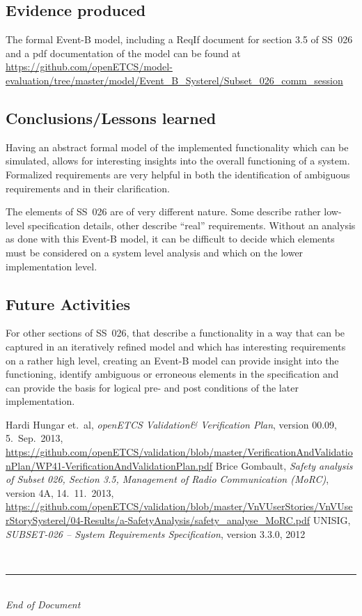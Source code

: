 \documentclass{article}
\newcommand{\nl}{\mbox{}\\}
\newcommand{\eod}{\nl\rule{.95\textwidth}{1pt}\nl\textit{End of Document}}
\begin{document}
\subsection{Evidence produced}
\label{sec:evidence-produced}

The formal Event-B model, including a ReqIf document for section 3.5 of SS~026
and a pdf documentation of the model can be found at
\url{https://github.com/openETCS/model-evaluation/tree/master/model/Event_B_Systerel/Subset_026_comm_session}

\subsection{Conclusions/Lessons learned}

Having an abstract formal model of the implemented functionality which can be
simulated, allows for interesting insights into the overall functioning of a
system. Formalized requirements are very helpful in both the identification of
ambiguous requirements and in their clarification.

The elements of SS~026 are of very different nature. Some describe rather
low-level specification details, other describe ``real'' requirements. Without
an analysis as done with this Event-B model, it can be difficult to decide which
elements must be considered on a system level analysis and which on the lower
implementation level.


\subsection{Future Activities}
\label{sec:future-activities}

For other sections of SS~026, that describe a functionality in a way that can be
captured in an iteratively refined model and which has interesting requirements
on a rather high level, creating an Event-B model can provide insight into the
functioning, identify ambiguous or erroneous elements in the specification and
can provide the basis for logical pre- and post conditions of the later
implementation.

\begin{thebibliography}{9}
 Hardi Hungar et.~al, \emph{openETCS Validation\& Verification
    Plan}, version 00.09, 5.~Sep.~2013,
  \url{https://github.com/openETCS/validation/blob/master/VerificationAndValidationPlan/WP41-VerificationAndValidationPlan.pdf}
 Brice Gombault, \emph{Safety analysis of Subset 026,
    Section 3.5, Management of Radio Communication (MoRC)}, version 4A,
  14.~11.~2013,
  \url{https://github.com/openETCS/validation/blob/master/VnVUserStories/VnVUserStorySysterel/04-Results/a-SafetyAnalysis/safety_analyse_MoRC.pdf}
 UNISIG, \emph{{SUBSET-026} – {S}ystem {R}equirements
    {S}pecification}, version 3.3.0, 2012
\end{thebibliography}

\eod
\end{document}
